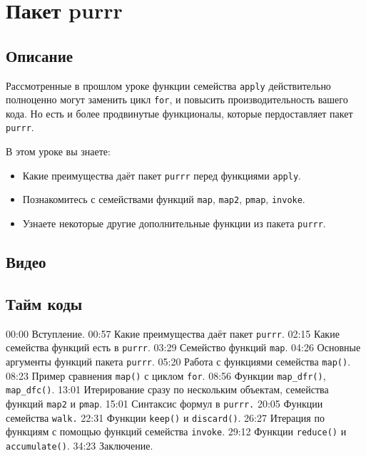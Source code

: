 \documentclass[
]{book}
\providecommand{\tightlist}{%
  \setlength{\itemsep}{0pt}\setlength{\parskip}{0pt}}
\begin{document}
\hypertarget{ux43fux430ux43aux435ux442-purrr}{%
\chapter{Пакет purrr}\label{ux43fux430ux43aux435ux442-purrr}}

\hypertarget{ux43eux43fux438ux441ux430ux43dux438ux435-3}{%
\section{Описание}\label{ux43eux43fux438ux441ux430ux43dux438ux435-3}}

Рассмотренные в прошлом уроке функции семейства \texttt{apply} действительно полноценно могут заменить цикл \texttt{for}, и повысить производительность вашего кода. Но есть и более продвинутые функционалы, которые пердоставляет пакет \texttt{purrr}.

В этом уроке вы знаете:

\begin{itemize}
\tightlist
\item
  Какие преимущества даёт пакет \texttt{purrr} перед функциями \texttt{apply}.
\item
  Познакомитесь с семействами функций \texttt{map}, \texttt{map2}, \texttt{pmap}, \texttt{invoke}.
\item
  Узнаете некоторые другие дополнительные функции из пакета \texttt{purrr}.
\end{itemize}

\hypertarget{ux432ux438ux434ux435ux43e-3}{%
\section{Видео}\label{ux432ux438ux434ux435ux43e-3}}

\hypertarget{ux442ux430ux439ux43c-ux43aux43eux434ux44b-3}{%
\section{Тайм коды}\label{ux442ux430ux439ux43c-ux43aux43eux434ux44b-3}}

00:00 Вступление.
00:57 Какие преимущества даёт пакет \texttt{purrr}.
02:15 Какие семейства функций есть в \texttt{purrr}.
03:29 Семейство функций \texttt{map}.
04:26 Основные аргументы функций пакета \texttt{purrr}.
05:20 Работа с функциями семейства \texttt{map()}.
08:23 Пример сравнения \texttt{map()} с циклом \texttt{for}.
08:56 Функции \texttt{map\_dfr()}, \texttt{map\_dfc()}.
13:01 Итерирование сразу по нескольким объектам, семейства функций \texttt{map2} и \texttt{pmap}.
15:01 Синтаксис формул в \texttt{purrr.}
20:05 Функции семейства \texttt{walk.}
22:31 Функции \texttt{keep()} и \texttt{discard()}.
26:27 Итерация по функциям с помощью функций семейства \texttt{invoke}.
29:12 Функции \texttt{reduce()} и \texttt{accumulate()}.
34:23 Заключение.
\end{document}
